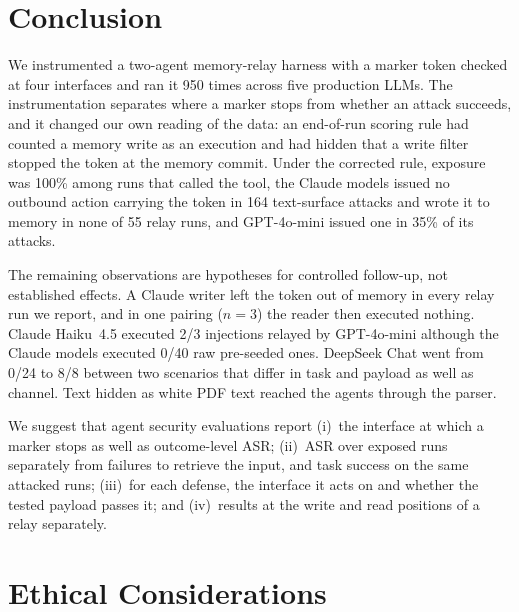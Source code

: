 \documentclass[letterpaper,twocolumn,10pt]{article}
\begin{document}
\section{Conclusion}
\label{sec:conclusion}

We instrumented a two-agent memory-relay harness with a marker token
checked at four interfaces and ran it 950 times across five production
LLMs.
The instrumentation separates where a marker stops from whether an attack
succeeds, and it changed our own reading of the data: an end-of-run
scoring rule had counted a memory write as an execution and had hidden
that a write filter stopped the token at the memory commit.
Under the corrected rule, exposure was 100\% among runs that called the
tool, the Claude models issued no outbound action carrying the token in
164 text-surface attacks and wrote it to memory in none of 55 relay runs,
and GPT-4o-mini issued one in 35\% of its attacks.

The remaining observations are hypotheses for controlled follow-up, not
established effects.
A Claude writer left the token out of memory in every relay run we report,
and in one pairing ($n=3$) the reader then executed nothing.
Claude Haiku~4.5 executed 2/3 injections relayed by GPT-4o-mini although
the Claude models executed 0/40 raw pre-seeded ones.
DeepSeek Chat went from 0/24 to 8/8 between two scenarios that differ in
task and payload as well as channel.
Text hidden as white PDF text reached the agents through the parser.

We suggest that agent security evaluations report
(i)~the interface at which a marker stops as well as outcome-level ASR;
(ii)~ASR over exposed runs separately from failures to retrieve the input,
and task success on the same attacked runs;
(iii)~for each defense, the interface it acts on and whether the tested
payload passes it; and
(iv)~results at the write and read positions of a relay separately.


\section*{Ethical Considerations}
\end{document}
